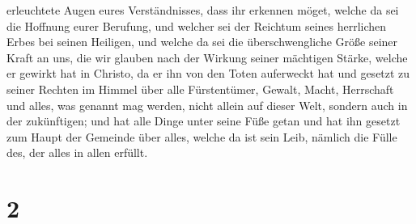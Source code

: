 erleuchtete Augen eures Verständnisses, dass ihr erkennen möget, welche
da sei die Hoffnung eurer Berufung, und welcher sei der Reichtum seines
herrlichen Erbes bei seinen Heiligen,  und welche da sei
die überschwengliche Größe seiner Kraft an uns, die wir glauben nach der
Wirkung seiner mächtigen Stärke,  welche er gewirkt hat
in Christo, da er ihn von den Toten auferweckt hat und gesetzt zu seiner
Rechten im Himmel  über alle Fürstentümer, Gewalt, Macht,
Herrschaft und alles, was genannt mag werden, nicht allein auf dieser
Welt, sondern auch in der zukünftigen;  und hat alle
Dinge unter seine Füße getan und hat ihn gesetzt zum Haupt der Gemeinde
über alles,  welche da ist sein Leib, nämlich die Fülle
des, der alles in allen erfüllt.

\hypertarget{section-1}{%
\section{2}\label{section-1}}

